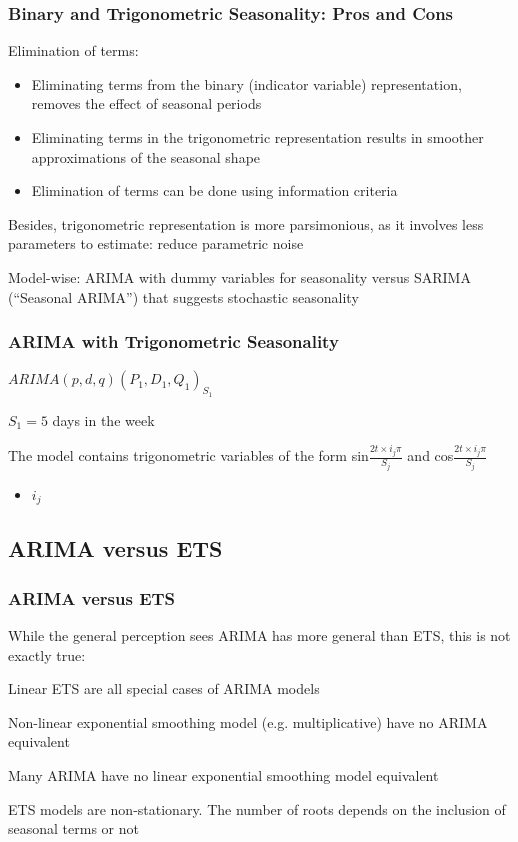 \documentclass{beamer}
\newenvironment{wideitemize}{\itemize\addtolength{\itemsep}{10pt}}{\enditemize}
\begin{document}
\begin{frame}
  \frametitle{Binary and Trigonometric Seasonality: Pros and Cons}
  \begin{wideitemize}
  \item Elimination of terms:
    \begin{itemize}
    \item Eliminating terms from the binary (indicator variable) representation, removes the effect of seasonal periods
    \item Eliminating terms in the trigonometric representation results in smoother approximations of the seasonal shape 
    \item Elimination of terms can be done using information criteria
    \end{itemize}
  \item Besides, trigonometric representation is more parsimonious, as it involves less parameters to estimate: reduce parametric noise
  \item Model-wise: ARIMA with dummy variables for seasonality versus SARIMA (“Seasonal ARIMA”) that suggests stochastic seasonality
  \end{wideitemize}
\end{frame}


\begin{frame}
  \frametitle{ARIMA with Trigonometric Seasonality}
  \begin{wideitemize}
    \item $ARIMA(p, d, q)(P_1, D_1, Q_1)_{S_1}$
    \item $S_1 = 5$ days in the week
    \item The model contains trigonometric variables of the form sin$\frac{2 t \times i_j \pi}{S_j}$ and cos$\frac{2 t \times i_j \pi}{S_j}$
      \begin{itemize}
      \item $i_j$
      \end{itemize}
  \end{wideitemize}
\end{frame}


\subsection{ARIMA versus ETS}


\begin{frame}
  \frametitle{ARIMA versus ETS}
  While the general perception sees ARIMA has more general than ETS, this is not exactly true:

  \begin{wideitemize}
  \item Linear ETS are all special cases of ARIMA models
  \item Non-linear exponential smoothing model (e.g. multiplicative) have no ARIMA equivalent
  \item Many ARIMA have no linear exponential smoothing model equivalent
  \item ETS models are non-stationary. The number of roots depends on the inclusion of seasonal terms or not
  \end{wideitemize}
\end{frame}
\end{document}
